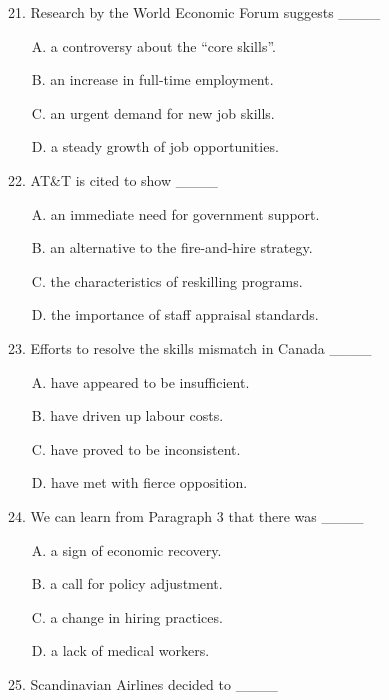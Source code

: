 \documentclass[UTF8,11pt]{ctexart}
\begin{document}
21. Research by the World Economic Forum suggests \_\_\_\_


\begin{itemize}[leftmargin=2em,itemsep=.2em,topsep=.4em]\item[A.] a controversy about the “core skills”.
\item[B.] an increase in full-time employment.
\item[C.] an urgent demand for new job skills.
\item[D.] a steady growth of job opportunities.
\end{itemize}

22. AT\&T is cited to show \_\_\_\_


\begin{itemize}[leftmargin=2em,itemsep=.2em,topsep=.4em]\item[A.] an immediate need for government support.
\item[B.] an alternative to the fire-and-hire strategy.
\item[C.] the characteristics of reskilling programs.
\item[D.] the importance of staff appraisal standards.
\end{itemize}

23. Efforts to resolve the skills mismatch in Canada \_\_\_\_


\begin{itemize}[leftmargin=2em,itemsep=.2em,topsep=.4em]\item[A.] have appeared to be insufficient.
\item[B.] have driven up labour costs.
\item[C.] have proved to be inconsistent.
\item[D.] have met with fierce opposition.
\end{itemize}

24. We can learn from Paragraph 3 that there was \_\_\_\_


\begin{itemize}[leftmargin=2em,itemsep=.2em,topsep=.4em]\item[A.] a sign of economic recovery.
\item[B.] a call for policy adjustment.
\item[C.] a change in hiring practices.
\item[D.] a lack of medical workers.
\end{itemize}

25. Scandinavian Airlines decided to \_\_\_\_
\end{document}
